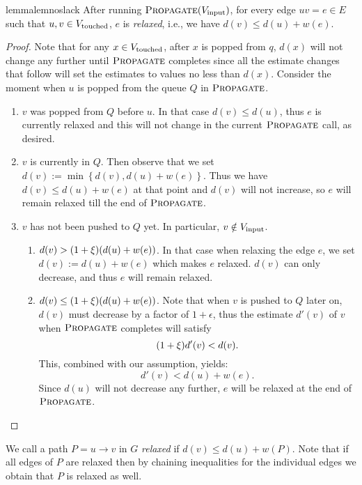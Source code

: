 \documentclass[11pt,letterpaper]{article}
\theoremstyle{plain}
\newcommand{\wei}{w}
\newcommand{\set}[1]{\left\lbrace #1 \right\rbrace}
\DeclareMathOperator*{\PD}{\textsc{Propagate}}
\begin{document}
\begin{restatable}{lemma}{lemnoslack}\label{lem:no_slack}
After running $\PD(\Vinput)$, for every edge $uv=e\in E$ such that \linebreak ${u, v \in V_{\mathrm{touched}}}$, $e$ is \emph{relaxed}, i.e., we have $d(v)\leq d(u)+\wei(e)$.
\end{restatable}
  \begin{proof}
    Note that for any $x\in V_{\mathrm{touched}}$, after $x$ is popped from $q$, $d(x)$ will not change any further until $\PD$ completes 
    since all the estimate changes that follow will set the estimates to values no less than $d(x)$.
		Consider the moment when $u$ is popped from the queue $Q$ in $\PD$.

  \begin{enumerate}[label=${\arabic*}^\circ)$]
			\item $v$ was popped from $Q$ before $u$. In that case $d(v) \le d(u)$, thus
        $e$ is currently relaxed and this will not change in the current $\PD$ call, as desired.
      \item $v$ is currently in $Q$. Then observe that we set $d(v):=\min\set{d(v), d(u) + \wei(e)}$. Thus we have $d(v) \le d(u) + w(e)$ at that point and $d(v)$ will not increase, so $e$ will remain relaxed till the end of $\PD$.
			\item $v$ has not been pushed to $Q$ yet. In particular, $v\notin V_{\mathrm{input}}$.

  \begin{enumerate}[label=$3.{\arabic*}^\circ)$]
				\item
          $d(v)>(1+\epsp)(d(u)+\wei(e))$. In that case when relaxing the edge $e$, we set $d(v):=d(u) + w(e)$ which
          makes $e$ relaxed.
          $d(v)$ can only decrease, and thus $e$ will remain relaxed.
				\item
          $d(v)\leq (1+\epsp)(d(u)+\wei(e))$.
          Note that when $v$ is pushed to $Q$ later on, $d(v)$ must decrease by a factor of $1 + \epsilon$, thus the estimate $d'(v)$ of $v$
          when $\PD$ completes will satisfy
          \[(1 + \xi)d'(v) < d(v).\]
					This, combined with
          our assumption, yields:
          \[d'(v)<d(u)+\wei(e). \]
          Since $d(u)$ will not decrease any further,
          $e$ will be relaxed at the end of $\PD$.
			\end{enumerate}
		\end{enumerate}
	\end{proof}


We call a path $P=u\to v$ in $G$ \emph{relaxed} if $d(v)\leq d(u)+\wei(P)$. Note that if all edges of $P$ are relaxed then by chaining inequalities for the individual edges we obtain that $P$ is relaxed as well.
\end{document}
